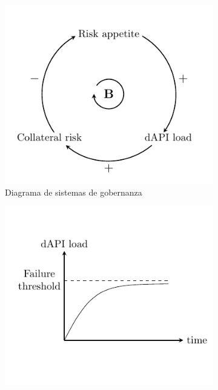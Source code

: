 \documentclass[11pt]{article}
\begin{document}
\begin{figure}
     \centering
     \begin{subfigure}{0.49\textwidth}
         \includegraphics[width=\textwidth]{fig/systems-diagram.pdf}
         \caption{Diagrama de sistemas de gobernanza}
         \label{fig:systems-diagram}
     \end{subfigure}
     \begin{subfigure}{0.49\textwidth}
         \includegraphics[width=\textwidth]{fig/systems-diagram-plot.pdf}

\end{subfigure}
\end{figure}
\end{document}
